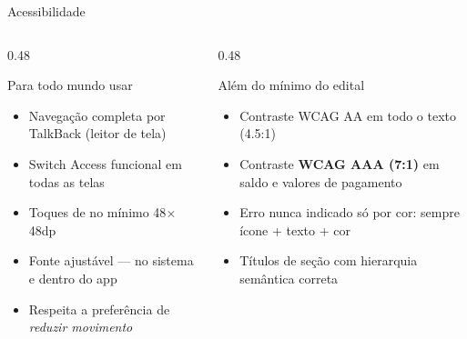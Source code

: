 \documentclass[10pt, aspectratio=169]{beamer}
\begin{document}
\begin{frame}{Acessibilidade}
    \begin{columns}[T]
        \begin{column}{0.48\textwidth}
            \begin{block}{Para todo mundo usar}
                \small
                \begin{itemize}
                    \item Navegação completa por TalkBack (leitor de tela)
                    \item Switch Access funcional em todas as telas
                    \item Toques de no mínimo 48$\times$48dp
                    \item Fonte ajustável --- no sistema e dentro do app
                    \item Respeita a preferência de \textit{reduzir movimento}
                \end{itemize}
            \end{block}
        \end{column}
        \begin{column}{0.48\textwidth}
            \begin{exampleblock}{Além do mínimo do edital}
                \small
                \begin{itemize}
                    \item Contraste WCAG AA em todo o texto (4.5:1)
                    \item Contraste \textbf{WCAG AAA (7:1)} em saldo e valores de pagamento
                    \item Erro nunca indicado só por cor: sempre ícone + texto + cor
                    \item Títulos de seção com hierarquia semântica correta
                \end{itemize}
            \end{exampleblock}
        \end{column}
    \end{columns}
\end{frame}
\end{document}
